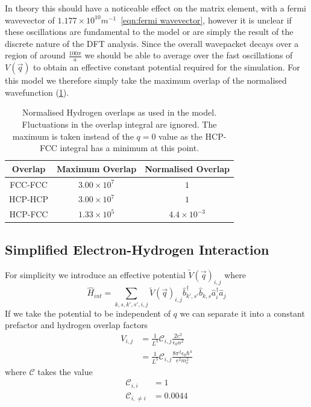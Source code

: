 In theory this should have a noticeable
effect on the matrix element, with a
fermi wavevector of
\(1.177\times{}10^{10} m^{-1}\)~\cref{eqn:fermi wavevector},
however it is unclear if these oscillations
are fundamental to the model
or are simply the result
of the discrete nature of the
DFT analysis.
Since the overall wavepacket decays over a region
of around \(\frac{100\pi}{a}\) we should be
able to average over the fast oscillations of
\(V(\vec{q})\) to obtain an effective constant
potential required for the simulation. For this
model we therefore simply take the maximum overlap
of the normalised wavefunction (\cref{tab:hydrogen overlaps}).
\begin{table}[htbp]
    \begin{center}
        \begin{tabular}{ *{3}{c} }
            \toprule
            Overlap & Maximum Overlap        & Normalised Overlap     \\
            \midrule
            FCC-FCC & \(3.00\times{}10^{7}\) & \(1\)                  \\
            HCP-HCP & \(3.00\times{}10^{7}\) & \(1\)                  \\
            HCP-FCC & \(1.33\times{}10^{5}\) & \(4.4\times{}10^{-3}\) \\
            \bottomrule
        \end{tabular}
    \end{center}
    \caption{Normalised Hydrogen overlaps as used in the
        model. Fluctuations in the overlap
        integral are ignored. The maximum
        is taken instead of the \(q=0\) value as the HCP-FCC integral
        has a minimum at this point.}\label{tab:hydrogen overlaps}
\end{table}

\subsection{Simplified Electron-Hydrogen Interaction
}\label{sec:simplified interaction}
For simplicity we introduce
an effective potential
\({\tilde{V}(\vec{q})}_{i,j}\) where
\begin{equation}
    \hat{H}_{int} = \sum_{k,s,k',s',i,j}
    {\tilde{V}(\vec{q})}_{i,j}
    \hat{b}^\dagger_{k',s'}\hat{b}_{k,s}
    \hat{a}^\dagger_{i}\hat{a}_{j}
    \label{eqn:interaction hamiltonian in k}
\end{equation}
If we take the potential to be independent
of \(q\) we can separate it
into a constant prefactor
and hydrogen overlap factors
\begin{align}
    V_{i,j}
     & =
    \frac{1}{L^3}
    \mathcal{C}_{i,j}
    \frac{2e^2}{\epsilon_0 \alpha^2} \\
     & =
    \frac{1}{L^3}
    \mathcal{C}_{i,j}
    \frac{8 \pi^2 \epsilon_0 \hbar^4}{e^2 m_e^2}
    \label{eqn:simplified interacton potential}
\end{align}
where \(\mathcal{C}\) takes
the value
\begin{align}
    \mathcal{C}_{i, i}      & = 1      \\
    \mathcal{C}_{i, \neq i} & = 0.0044
\end{align}

